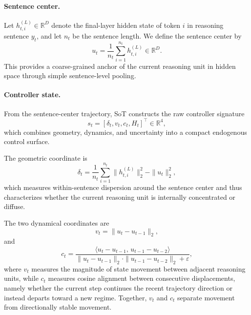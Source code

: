 \paragraph{Sentence center.}
Let \(h^{(L)}_{t,i}\in\mathbb{R}^{D}\) denote the final-layer hidden state of token \(i\) in reasoning sentence \(y_t\), and let \(n_t\) be the sentence length. 
We define the sentence center by
\begin{equation}
u_t=\frac{1}{n_t}\sum_{i=1}^{n_t} h_{t,i}^{(L)} \in \mathbb{R}^{D}.
\label{eq:app_u}
\end{equation}
This provides a coarse-grained anchor of the current reasoning unit in hidden space through simple sentence-level pooling.

\paragraph{Controller state.}
From the sentence-center trajectory, SoT constructs the raw controller signature
\begin{equation}
s_t=[\delta_t,v_t,c_t,H_t]^{\top}\in\mathbb{R}^{4},
\label{eq:app_sig}
\end{equation}
which combines geometry, dynamics, and uncertainty into a compact endogenous control surface.

The geometric coordinate is
\begin{equation}
\delta_t=
\frac{1}{n_t}\sum_{i=1}^{n_t}\|h_{t,i}^{(L)}\|_2^2-\|u_t\|_2^2,
\label{eq:app_delta}
\end{equation}
which measures within-sentence dispersion around the sentence center and thus characterizes whether the current reasoning unit is internally concentrated or diffuse.

The two dynamical coordinates are
\begin{equation}
v_t=\|u_t-u_{t-1}\|_2,
\label{eq:app_v}
\end{equation}
and
\begin{equation}
c_t=
\frac{\langle u_t-u_{t-1},\,u_{t-1}-u_{t-2}\rangle}
{\|u_t-u_{t-1}\|_2\cdot\|u_{t-1}-u_{t-2}\|_2+\varepsilon},
\label{eq:app_c}
\end{equation}
where \(v_t\) measures the magnitude of state movement between adjacent reasoning units, while \(c_t\) measures cosine alignment between consecutive displacements, namely whether the current step continues the recent trajectory direction or instead departs toward a new regime. 
Together, \(v_t\) and \(c_t\) separate movement from directionally stable movement.

